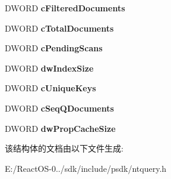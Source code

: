 \begin{DoxyCompactItemize}
D\+W\+O\+RD {\bfseries c\+Filtered\+Documents}
\item 
\mbox{\label{struct___c_i___s_t_a_t_e_a980a2082511c5194079d16b3494d2e27}} 
D\+W\+O\+RD {\bfseries c\+Total\+Documents}
\item 
\mbox{\label{struct___c_i___s_t_a_t_e_ae1fb753bb72538b2a9f8cdef2e075f4c}} 
D\+W\+O\+RD {\bfseries c\+Pending\+Scans}
\item 
\mbox{\label{struct___c_i___s_t_a_t_e_a4a612099e3eff59d6af8a77b1ab69eb0}} 
D\+W\+O\+RD {\bfseries dw\+Index\+Size}
\item 
\mbox{\label{struct___c_i___s_t_a_t_e_a727b6ac9c15688b431b44ed2e8c5942b}} 
D\+W\+O\+RD {\bfseries c\+Unique\+Keys}
\item 
\mbox{\label{struct___c_i___s_t_a_t_e_a86eb6834f74fdc77ad5761e515540ac3}} 
D\+W\+O\+RD {\bfseries c\+Seq\+Q\+Documents}
\item 
\mbox{\label{struct___c_i___s_t_a_t_e_ac8e33626b841b215609476d6f26c13ef}} 
D\+W\+O\+RD {\bfseries dw\+Prop\+Cache\+Size}
\end{DoxyCompactItemize}


该结构体的文档由以下文件生成\+:\begin{DoxyCompactItemize}
\item 
E\+:/\+React\+O\+S-\/0../sdk/include/psdk/ntquery.\+h\end{DoxyCompactItemize}
